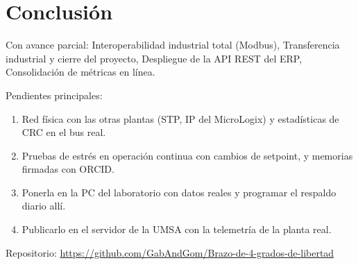 \documentclass[a4paper,11pt]{article}
\begin{document}
\section{Conclusión}
Con avance parcial: Interoperabilidad industrial total (Modbus), Transferencia industrial y cierre del proyecto, Despliegue de la API REST del ERP, Consolidación de métricas en línea.
\par\smallskip Pendientes principales:
\begin{enumerate}
\item Red física con las otras plantas (STP, IP del MicroLogix) y estadísticas de CRC en el bus real.
\item Pruebas de estrés en operación continua con cambios de setpoint, y memorias firmadas con ORCID.
\item Ponerla en la PC del laboratorio con datos reales y programar el respaldo diario allí.
\item Publicarlo en el servidor de la UMSA con la telemetría de la planta real.
\end{enumerate}
\par\smallskip\noindent Repositorio: \url{https://github.com/GabAndGom/Brazo-de-4-grados-de-libertad}
\end{document}
